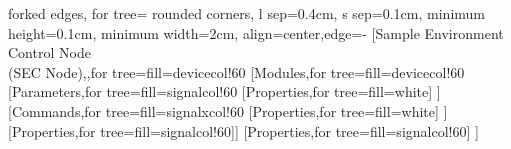 \documentclass[margin=10pt]{standalone}
\def\devcol{devicecol!60}
\def\sigcol{signalcol!60}
\def\sigxcol{signalxcol!60}
\begin{document}
		
	
			\begin{forest}
		forked edges,
		for tree={%
			rounded corners,
			l sep=0.4cm,
			s sep=0.1cm,
			minimum height=0.1cm,
			minimum width=2cm,
			align=center,edge={-}}
		[Sample Environment Control Node\\(SEC Node),,for tree={fill=\devcol}
		[Modules,for tree={fill=\devcol}				
		[Parameters,for tree={fill=\sigcol} [Properties,for tree={fill=white}] ]
		[Commands,for tree={fill=\sigxcol} [Properties,for tree={fill=white}] ]
		[Properties,for tree={fill=\sigcol}]]
		[Properties,for tree={fill=\sigcol}]
		]
	\end{forest}
\end{document}

